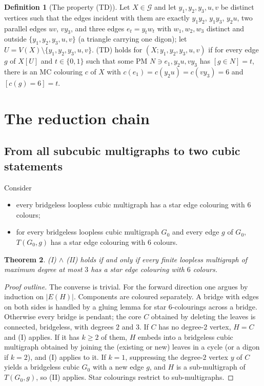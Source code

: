 \documentclass[11pt]{amsart}
\newtheorem{theorem}{Theorem}[section]
\theoremstyle{definition}
\newtheorem{definition}[theorem]{Definition}
\theoremstyle{remark}
\newcommand{\cG}{\mathcal{G}}
\newcommand{\hyp}[1]{\textup{(#1)}}
\begin{document}
\begin{definition}[The property (TD)]\label{def:td}
Let $X\in\cG$ and let $y_1,y_2,y_3,u,v$ be distinct vertices such that the edges incident with them are exactly $y_1y_2$, $y_1y_3$, $y_2u$, two parallel edges $uv$, $vy_3$, and three edges $e_t=y_tw_t$ with $w_1,w_2,w_3$ distinct and outside $\{y_1,y_2,y_3,u,v\}$ (a triangle carrying one digon); let $U=V(X)\setminus\{y_1,y_2,y_3,u,v\}$. \hyp{TD} holds for $(X;y_1,y_2,y_3,u,v)$ if for every edge $g$ of $X[U]$ and $t\in\{0,1\}$ such that some PM $N\ni e_1,y_2u,vy_3$ has $[g\in N]=t$, there is an MC colouring $c$ of $X$ with $c(e_1)=c(y_2u)=c(vy_3)=6$ and $[c(g)=6]=t$.
\end{definition}

\section{The reduction chain}\label{sec:reduction}

\subsection{From all subcubic multigraphs to two cubic statements}
Consider
\begin{itemize}
\item[\hyp{I}] every bridgeless loopless cubic multigraph has a star edge colouring with $6$ colours;
\item[\hyp{II}] for every bridgeless loopless cubic multigraph $G_0$ and every edge $g$ of $G_0$, $T(G_0,g)$ has a star edge colouring with $6$ colours.
\end{itemize}

\begin{theorem}\label{thm:I-II}
\hyp{I} $\wedge$ \hyp{II} holds if and only if every finite loopless multigraph of maximum degree at most $3$ has a star edge colouring with $6$ colours.
\end{theorem}
\begin{proof}[Proof outline]
The converse is trivial. For the forward direction one argues by induction on $|E(H)|$. Components are coloured separately. A bridge with edges on both sides is handled by a gluing lemma for star $6$-colourings across a bridge.
Otherwise every bridge is pendant; the core $C$ obtained by deleting the leaves is connected, bridgeless, with degrees $2$ and $3$. If $C$ has no degree-$2$ vertex, $H=C$ and \hyp{I} applies. If it has $k\ge 2$ of them, $H$ embeds into a bridgeless cubic multigraph obtained by joining the (existing or new) leaves in a cycle (or a digon if $k=2$), and \hyp{I} applies to it. If $k=1$, suppressing the degree-$2$ vertex $y$ of $C$ yields a bridgeless cubic $G_0$ with a new edge $g$, and $H$ is a sub-multigraph of $T(G_0,g)$, so \hyp{II} applies. Star colourings restrict to sub-multigraphs.
\end{proof}
\end{document}
